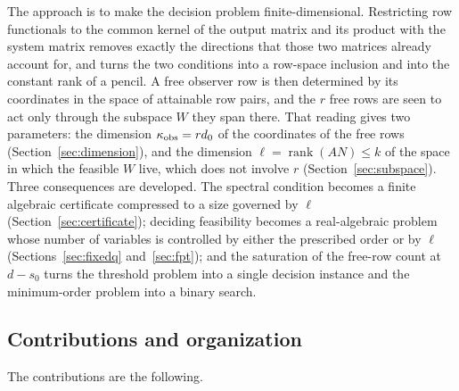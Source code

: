 \documentclass[journal]{IEEEtran}
\theoremstyle{plainn}
\theoremstyle{remark}
\begin{document}
The approach is to make the decision problem finite-dimensional. Restricting row
functionals to the common kernel of the output matrix and its product with the system
matrix removes exactly the directions that those two matrices already account for, and
turns the two conditions into a row-space inclusion and into the constant rank of a
pencil. A free observer row is then determined by its coordinates in the space of
attainable row pairs, and the $r$ free rows are seen to act only through the subspace $W$
they span there. That reading gives two parameters: the dimension $\kappa_{\rm obs}=rd_0$
of the coordinates of the free rows (Section~\ref{sec:dimension}), and the dimension
$\ell=\operatorname{rank}(AN)\le k$ of the space in which the feasible $W$ live, which does
not involve $r$ (Section~\ref{sec:subspace}). Three consequences are developed. The spectral
condition becomes a finite algebraic certificate compressed to a size governed by $\ell$
(Section~\ref{sec:certificate}); deciding feasibility becomes a real-algebraic problem
whose number of variables is controlled by either the prescribed order or by $\ell$
(Sections~\ref{sec:fixedq} and~\ref{sec:fpt}); and the saturation of the free-row count at
$d-s_0$ turns the threshold problem into a single decision instance and the minimum-order
problem into a binary search.

\subsection{Contributions and organization}\label{sec:contrib}

The contributions are the following.
\end{document}
